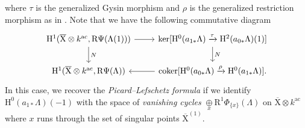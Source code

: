 \documentclass[10pt]{amsart}
\numberwithin{equation}{section}
\theoremstyle{plain}
\numberwithin{equation}{section}
\theoremstyle{definition}
\theoremstyle{remark}
\def\coker{\mathrm{coker}}
\def\ac{\mathrm{ac}}
\def\ac{\mathrm{ac}}
\def\rmH{\mathrm{H}}
\def\rmX{\mathrm{X}}
\def\rmXbar{\overline{\rmX}}
\def\rmR{\mathrm{R}}
\begin{document}
where $\tau$ is the generalized {Gysin morphism} and $\rho$ is the generalized {restriction morphism} as in \cite[p. 610]{Saito}. 
Note that we have the following commutative diagram
\begin{equation}\label{picard-lef}
\begin{tikzcd}
\rmH^{1}(\rmXbar\otimes{k^{\ac}},\rmR\Psi (\Lambda(1))) \arrow[r] \arrow[d, "N"] & \ker[\rmH^{0}(a_{1*}\Lambda)\xrightarrow{\tau} \rmH^{2}(a_{0*}\Lambda)(1)] \arrow[d, "N"] \\
\rmH^{1}(\rmXbar\otimes{k^{\ac}}, \rmR\Psi(\Lambda))                  & \coker[\rmH^{0}(a_{0*}\Lambda)\xrightarrow{\rho} \rmH^{0}(a_{1*}\Lambda)] .\arrow[l]
\end{tikzcd}
\end{equation}
In this case, we recover the \emph{Picard--Lefschetz formula} if we identify $\rmH^{0}(a_{1*}\Lambda)(-1)$ with the space of \emph{vanishing cycles} $\underset{x}\oplus\rmR^{1}\Phi_{\{x\}}(\Lambda)$
on $\rmXbar\otimes{k^{\ac}}$ where $x$ runs through the set of singular points $\rmXbar^{(1)}$. 
\end{document}
